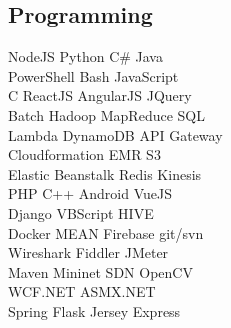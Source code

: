 \documentclass[]{deedy-resume-openfont}
\begin{document}
\begin{minipage}[t]{0.33\textwidth}
\subsection{Programming}
NodeJS \textbullet{} Python \textbullet{} C\# \textbullet{} Java \\
PowerShell \textbullet{} Bash \textbullet{} JavaScript \\
C \textbullet{} ReactJS \textbullet{} AngularJS \textbullet{} JQuery \\
Batch \textbullet{} Hadoop MapReduce \textbullet{} SQL \\
Lambda \textbullet{} DynamoDB \textbullet{} API Gateway  \\
Cloudformation \textbullet{} EMR \textbullet{} S3 \\
Elastic Beanstalk \textbullet{} Redis \textbullet{} Kinesis \\
PHP \textbullet{} C++ \textbullet{} Android \textbullet{} VueJS \\
Django \textbullet{} VBScript \textbullet{} HIVE \\
Docker \textbullet{} MEAN \textbullet{} Firebase \textbullet{} git/svn \\
Wireshark \textbullet{} Fiddler \textbullet{} JMeter \\
Maven \textbullet{} Mininet SDN \textbullet{} OpenCV \\
WCF.NET \textbullet{} ASMX.NET \\
Spring \textbullet{} Flask \textbullet{} Jersey \textbullet{} Express

\sectionsep

%
%

\end{minipage} 
\hfill
\end{document}
